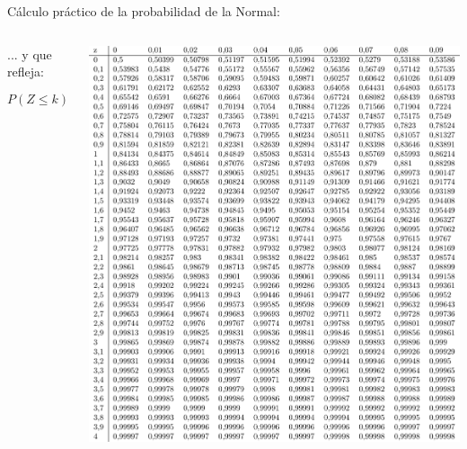 \documentclass[11pt,handout]{beamer}
\begin{document}
\begin{frame}{Cálculo práctico de la probabilidad de la Normal:}
\begin{columns}
\begin{column}{0.6\textwidth}
\begin{block}{}
... y que refleja:

$$P\left(Z\leq k \right), \ \  k \in \left[ 0 , 4'09 \right]$$
\begin{center}
    
\end{center}
\end{block}
\end{column}
\begin{column}{0.4\textwidth}
\includegraphics[page=1,width=1\textwidth]{probabilidad/distribucion_normal}
\end{column}
\end{columns}


\end{frame}
\end{document}

